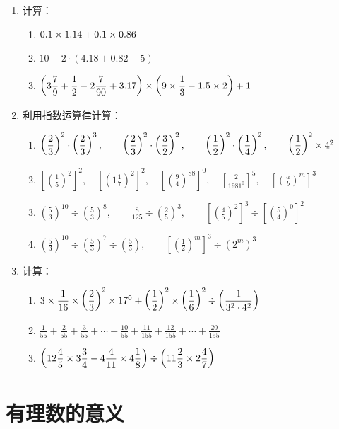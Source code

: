 \begin{enumerate}
	\item 计算：
	\begin{enumerate}
		\item $0.1\times 1.14+0.1\times 0.86$
		\item $10-2\cdot (4.18+0.82-5)$
		\item $\left(3\dfrac{7}{9}+\dfrac{1}{2}-2\dfrac{7}{90}+3.17\right)\times\left(9\times\dfrac{1}{3}-1.5\times 2\right)+1$
	\end{enumerate}
	
	\item 利用指数运算律计算：
	\begin{enumerate}
		\item $\left(\dfrac{2}{3}\right)^2\cdot \left(\dfrac{2}{3}\right)^3,\qquad \left(\dfrac{2}{3}\right)^2\cdot \left(\dfrac{3}{2}\right)^2,\qquad \left(\dfrac{1}{2}\right)^2\cdot \left(\dfrac{1}{4}\right)^2,\qquad \left(\dfrac{1}{2}\right)^2\times 4^2$
		\item $\left[\left(\frac{1}{5}\right)^2\right]^2,\quad \left[\left(1\frac{1}{7}\right)^2\right]^2,\quad \left[\left(\frac{9}{4}\right)^{88}\right]^0,\quad \left[\frac{2}{1981^0}\right]^5,\quad \left[\left(\frac{a}{b}\right)^m\right]^3$
		\item $\left(\frac{5}{3}\right)^{10}\div \left(\frac{5}{3}\right)^8,\qquad \frac{8}{125}\div\left(\frac{2}{5}\right)^3,\qquad \left[\left(\frac{4}{5}\right)^2\right]^3\div \left[\left(\frac{5}{4}\right)^0\right]^2$
		\item $\left(\frac{5}{3}\right)^{10}\div \left(\frac{5}{3}\right)^7\div \left(\frac{5}{3}\right),\qquad \left[\left(\frac{1}{2}\right)^m\right]^3\div (2^m)^3$
	\end{enumerate}
	
	\item 计算：
	\begin{enumerate}
		\item $3\times\dfrac{1}{16}\times\left(\dfrac{2}{3}\right)^2\times 17^0+\left(\dfrac{1}{2}\right)^2\times\left(\dfrac{1}{6}\right)^2\div \left(\dfrac{1}{3^2\cdot 4^2}\right)$
		\item  $\frac{1}{55}+\frac{2}{55}+\frac{3}{55}+\cdots+\frac{10}{55}+\frac{11}{155}+\frac{12}{155}+\cdots +\frac{20}{155}$ 
		\item $\left(12\dfrac{4}{5}\times 3\dfrac{3}{4}-4\dfrac{4}{11}\times 4\dfrac{1}{8}\right)\div \left(11\dfrac{2}{3}\times 2\dfrac{4}{7}\right)$
	\end{enumerate}
	
\end{enumerate}

\section{有理数的意义}
